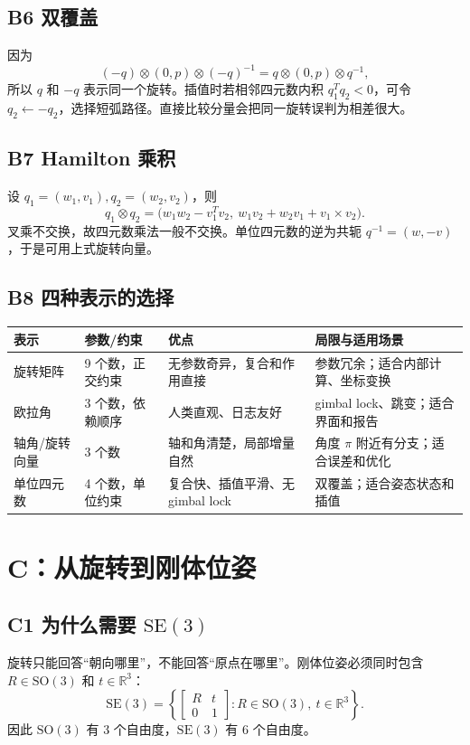\documentclass[UTF8,a4paper,11pt]{ctexart}
\newcommand{\R}{\mathbb{R}}
\newcommand{\SO}{\mathrm{SO}(3)}
\newcommand{\SE}{\mathrm{SE}(3)}
\begin{document}
\subsection{B6 双覆盖}
因为
\[
(-q)\otimes(0,p)\otimes(-q)^{-1}=q\otimes(0,p)\otimes q^{-1},
\]
所以 $q$ 和 $-q$ 表示同一个旋转。插值时若相邻四元数内积 $q_1^Tq_2<0$，可令 $q_2\leftarrow-q_2$，选择短弧路径。直接比较分量会把同一旋转误判为相差很大。

\subsection{B7 Hamilton 乘积}
设 $q_1=(w_1,v_1),q_2=(w_2,v_2)$，则
\[
q_1\otimes q_2=\bigl(w_1w_2-v_1^Tv_2,\ w_1v_2+w_2v_1+v_1\times v_2\bigr).
\]
叉乘不交换，故四元数乘法一般不交换。单位四元数的逆为共轭 $q^{-1}=(w,-v)$，于是可用上式旋转向量。

\subsection{B8 四种表示的选择}
\begin{center}
\begin{tabular}{p{2.2cm}p{2.2cm}p{3.2cm}p{3.2cm}}
\toprule
表示 & 参数/约束 & 优点 & 局限与适用场景\\
\midrule
旋转矩阵 & 9 个数，正交约束 & 无参数奇异，复合和作用直接 & 参数冗余；适合内部计算、坐标变换\\
欧拉角 & 3 个数，依赖顺序 & 人类直观、日志友好 & gimbal lock、跳变；适合界面和报告\\
轴角/旋转向量 & 3 个数 & 轴和角清楚，局部增量自然 & 角度 $\pi$ 附近有分支；适合误差和优化\\
单位四元数 & 4 个数，单位约束 & 复合快、插值平滑、无 gimbal lock & 双覆盖；适合姿态状态和插值\\
\bottomrule
\end{tabular}
\end{center}

\section{C：从旋转到刚体位姿}
\subsection{C1 为什么需要 \texorpdfstring{$\SE$}{SE(3)}}
旋转只能回答“朝向哪里”，不能回答“原点在哪里”。刚体位姿必须同时包含 $R\in\SO$ 和 $t\in\R^3$：
\[
\SE=\left\{\begin{bmatrix}R&t\\0&1\end{bmatrix}:R\in\SO,\ t\in\R^3\right\}.
\]
因此 $\SO$ 有 3 个自由度，$\SE$ 有 6 个自由度。
\end{document}
